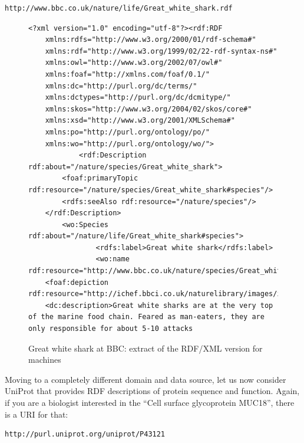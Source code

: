 \begin{lstlisting}
http://www.bbc.co.uk/nature/life/Great_white_shark.rdf
\end{lstlisting}

\begin{figure}
\begin{lstlisting}
<?xml version="1.0" encoding="utf-8"?><rdf:RDF
    xmlns:rdfs="http://www.w3.org/2000/01/rdf-schema#" 
    xmlns:rdf="http://www.w3.org/1999/02/22-rdf-syntax-ns#" 
    xmlns:owl="http://www.w3.org/2002/07/owl#" 
    xmlns:foaf="http://xmlns.com/foaf/0.1/" 
    xmlns:dc="http://purl.org/dc/terms/" 
    xmlns:dctypes="http://purl.org/dc/dcmitype/" 
    xmlns:skos="http://www.w3.org/2004/02/skos/core#"
    xmlns:xsd="http://www.w3.org/2001/XMLSchema#" 
    xmlns:po="http://purl.org/ontology/po/" 
    xmlns:wo="http://purl.org/ontology/wo/">
    		<rdf:Description rdf:about="/nature/species/Great_white_shark">
		<foaf:primaryTopic rdf:resource="/nature/species/Great_white_shark#species"/>
		<rdfs:seeAlso rdf:resource="/nature/species"/>
	</rdf:Description>
		<wo:Species rdf:about="/nature/life/Great_white_shark#species">
				<rdfs:label>Great white shark</rdfs:label>
				<wo:name rdf:resource="http://www.bbc.co.uk/nature/species/Great_white_shark#name"/>
	<foaf:depiction rdf:resource="http://ichef.bbci.co.uk/naturelibrary/images/ic/640x360/g/gr/great_white_shark/great_white_shark_1.jpg"/>
	<dc:description>Great white sharks are at the very top of the marine food chain. Feared as man-eaters, they are only responsible for about 5-10 attacks
\end{lstlisting}
    \caption{Great white shark at BBC: extract of the RDF/XML version for
machines}
    \label{fig:ch5.4}
\end{figure}

Moving to a completely different domain and data source, let us now
consider UniProt that provides RDF descriptions of protein sequence and
function. Again, if you are a biologist interested in the ``Cell surface
glycoprotein MUC18'', there is a URI for that:

\begin{lstlisting}
http://purl.uniprot.org/uniprot/P43121
\end{lstlisting}


